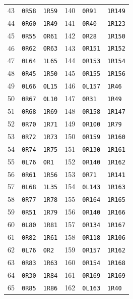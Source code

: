 {\begin{longtable}{@{}rll@{\qquad\quad}rll@{}}
43 & \texttt{0R58} & \texttt{1R59} & 140 & \texttt{0R91} & \texttt{1R149}\\
44 & \texttt{0R60} & \texttt{1R49} & 141 & \texttt{0R40} & \texttt{1R123}\\
45 & \texttt{0R55} & \texttt{0R61} & 142 & \texttt{0R28} & \texttt{1R150}\\
46 & \texttt{0R62} & \texttt{0R63} & 143 & \texttt{0R151} & \texttt{1R152}\\
47 & \texttt{0L64} & \texttt{1L65} & 144 & \texttt{0R153} & \texttt{1R154}\\
48 & \texttt{0R45} & \texttt{1R50} & 145 & \texttt{0R155} & \texttt{1R156}\\
49 & \texttt{0L66} & \texttt{0L15} & 146 & \texttt{0L157} & \texttt{1R46}\\
50 & \texttt{0R67} & \texttt{0L10} & 147 & \texttt{0R31} & \texttt{1R49}\\
51 & \texttt{0R68} & \texttt{1R69} & 148 & \texttt{0R158} & \texttt{1R147}\\
52 & \texttt{0R70} & \texttt{1R71} & 149 & \texttt{0R100} & \texttt{1R79}\\
53 & \texttt{0R72} & \texttt{1R73} & 150 & \texttt{0R159} & \texttt{1R160}\\
54 & \texttt{0R74} & \texttt{1R75} & 151 & \texttt{0R130} & \texttt{1R161}\\
55 & \texttt{0L76} & \texttt{0R1} & 152 & \texttt{0R140} & \texttt{1R162}\\
56 & \texttt{0R61} & \texttt{1R56} & 153 & \texttt{0R71} & \texttt{1R141}\\
57 & \texttt{0L68} & \texttt{1L35} & 154 & \texttt{0L143} & \texttt{1R163}\\
58 & \texttt{0R77} & \texttt{1R78} & 155 & \texttt{0R164} & \texttt{1R165}\\
59 & \texttt{0R51} & \texttt{1R79} & 156 & \texttt{0R140} & \texttt{1R166}\\
60 & \texttt{0L80} & \texttt{1R81} & 157 & \texttt{0R134} & \texttt{1R167}\\
61 & \texttt{0R82} & \texttt{1R61} & 158 & \texttt{0R118} & \texttt{1R106}\\
62 & \texttt{0L76} & \texttt{0R2} & 159 & \texttt{0R157} & \texttt{1R162}\\
63 & \texttt{0R83} & \texttt{1R63} & 160 & \texttt{0R154} & \texttt{1R168}\\
64 & \texttt{0R30} & \texttt{1R84} & 161 & \texttt{0R169} & \texttt{1R169}\\
65 & \texttt{0R85} & \texttt{1R86} & 162 & \texttt{0L163} & \texttt{1R40}\\

\end{longtable}}
